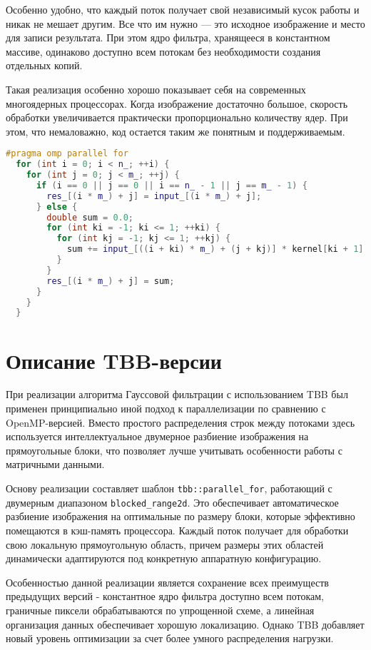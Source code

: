 \documentclass[a4paper,12pt]{article}
\begin{document}
Особенно удобно, что каждый поток получает свой независимый кусок работы и никак не мешает другим. Все что им нужно — это исходное изображение и место для записи результата. При этом ядро фильтра, хранящееся в константном массиве, одинаково доступно всем потокам без необходимости создания отдельных копий.

Такая реализация особенно хорошо показывает себя на современных многоядерных процессорах. Когда изображение достаточно большое, скорость обработки увеличивается практически пропорционально количеству ядер. При этом, что немаловажно, код остается таким же понятным и поддерживаемым.

\begin{lstlisting}[language=C++, caption=OMP-реализации]
#pragma omp parallel for
  for (int i = 0; i < n_; ++i) {
    for (int j = 0; j < m_; ++j) {
      if (i == 0 || j == 0 || i == n_ - 1 || j == m_ - 1) {
        res_[(i * m_) + j] = input_[(i * m_) + j];
      } else {
        double sum = 0.0;
        for (int ki = -1; ki <= 1; ++ki) {
          for (int kj = -1; kj <= 1; ++kj) {
            sum += input_[((i + ki) * m_) + (j + kj)] * kernel[ki + 1][kj + 1];
          }
        }
        res_[(i * m_) + j] = sum;
      }
    }
  }
\end{lstlisting}

\newpage

\section{Описание TBB-версии}

При реализации алгоритма Гауссовой фильтрации с использованием TBB был применен принципиально иной подход к параллелизации по сравнению с OpenMP-версией. Вместо простого распределения строк между потоками здесь используется интеллектуальное двумерное разбиение изображения на прямоугольные блоки, что позволяет лучше учитывать особенности работы с матричными данными.

Основу реализации составляет шаблон \texttt{tbb::parallel\_for}, работающий с двумерным диапазоном \texttt{blocked\_range2d}. Это обеспечивает автоматическое разбиение изображения на оптимальные по размеру блоки, которые эффективно помещаются в кэш-память процессора. Каждый поток получает для обработки свою локальную прямоугольную область, причем размеры этих областей динамически адаптируются под конкретную аппаратную конфигурацию.

Особенностью данной реализации является сохранение всех преимуществ предыдущих версий - константное ядро фильтра доступно всем потокам, граничные пиксели обрабатываются по упрощенной схеме, а линейная организация данных обеспечивает хорошую локализацию. Однако TBB добавляет новый уровень оптимизации за счет более умного распределения нагрузки.
\end{document}
